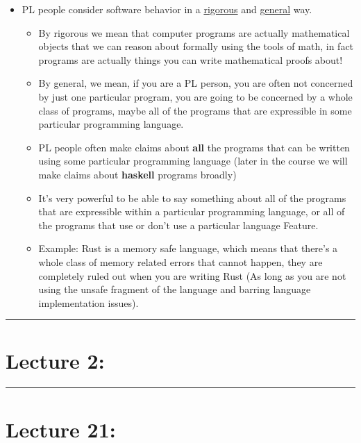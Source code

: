 \documentclass[11pt]{article}
\begin{document}
\begin{itemize}
  \item PL people consider software behavior in a \underline{rigorous} and \underline{general} way.
  \begin{itemize}
    \item By rigorous we mean that computer programs are actually mathematical objects that we can reason about formally using the tools of math, in fact programs are actually things you can write mathematical proofs about! 
    \item By general, we mean, if you are a PL person, you are often not concerned by just one particular program, you are going to be concerned by a whole class of programs, maybe all of the programs that are expressible in some particular programming language.
    \item PL people often make claims about \textbf{all} the programs that can be written using some particular programming language (later in the course we will make claims about \textbf{haskell} programs broadly)
    \item It's very powerful to be able to say something about all of the programs that are expressible within a particular programming language, or all of the programs that use or don't use a particular language Feature.
    \item Example: Rust is a memory safe language, which means that there's a whole class of memory related errors that cannot happen, they are completely ruled out when you are writing Rust (As long as you are not using the unsafe fragment of the language and barring language implementation issues).
  \end{itemize}
\end{itemize}

\begin{center}
	\rule{450pt}{1pt} 
\end{center}
\newpage

\section*{Lecture 2:}

\begin{center}
	\rule{450pt}{1pt} 
\end{center}
\newpage

\section*{Lecture 21:}
\end{document}
